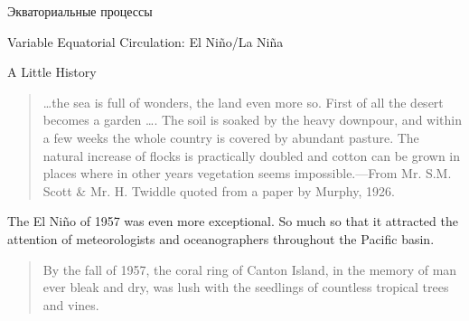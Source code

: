 \begin{chapter}{Экваториальные процессы}
\begin{section}{Variable Equatorial Circulation: El Ni\~{n}o/La Ni\~{n}a}
\begin{paragraph}{A Little History}
\begin{quotation}
\ldots the sea is full of wonders, the land even more so. First of all
the desert becomes a garden \ldots . The soil is soaked by the heavy
downpour, and within a few weeks the whole country is covered by
abundant pasture. The natural increase of flocks is practically
doubled and cotton can be grown in places where in other years
vegetation seems impossible.---From Mr. S.M. Scott \& Mr. H. Twiddle
quoted from a paper by Murphy, 1926.
%
\end{quotation}

The El Ni\~{n}o of 1957 was even more exceptional. So much so that it
attracted the attention of meteorologists and oceanographers
throughout the Pacific basin.
%
\begin{quotation}
By the fall of 1957, the coral ring of Canton Island, in the memory of
man ever bleak and dry, was lush with the seedlings of countless
tropical trees and vines.
%


\end{quotation}
\end{paragraph}
\end{section}
\end{chapter}
